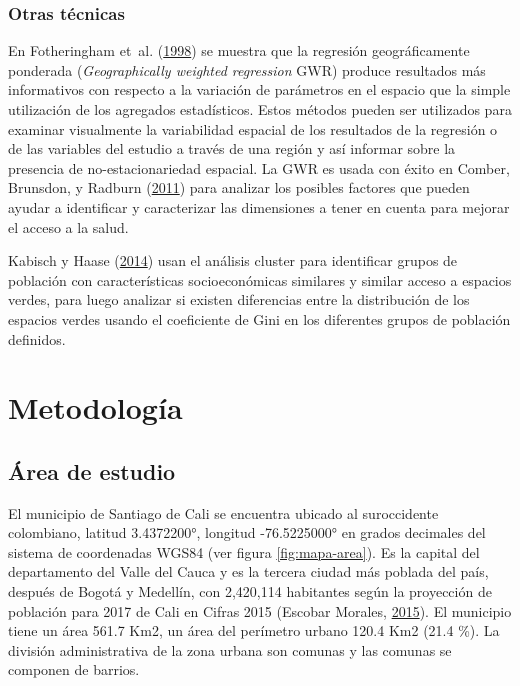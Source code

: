 \documentclass[12pt,a4paper,openany]{book}
\theoremstyle{definition}
\theoremstyle{definition}
\theoremstyle{definition}
\theoremstyle{remark}
\begin{document}
\subsection{Otras técnicas}\label{otras-tuxe9cnicas}

En Fotheringham et~al.
(\protect\hyperlink{ref-fotheringham_geographically_1998}{1998}) se
muestra que la regresión geográficamente ponderada (\emph{Geographically
weighted regression} GWR) produce resultados más informativos con
respecto a la variación de parámetros en el espacio que la simple
utilización de los agregados estadísticos. Estos métodos pueden ser
utilizados para examinar visualmente la variabilidad espacial de los
resultados de la regresión o de las variables del estudio a través de
una región y así informar sobre la presencia de no-estacionariedad
espacial. La GWR es usada con éxito en Comber, Brunsdon, y Radburn
(\protect\hyperlink{ref-comber_spatial_2011}{2011}) para analizar los
posibles factores que pueden ayudar a identificar y caracterizar las
dimensiones a tener en cuenta para mejorar el acceso a la salud.

Kabisch y Haase (\protect\hyperlink{ref-kabisch_green_2014}{2014}) usan
el análisis cluster para identificar grupos de población con
características socioeconómicas similares y similar acceso a espacios
verdes, para luego analizar si existen diferencias entre la distribución
de los espacios verdes usando el coeficiente de Gini en los diferentes
grupos de población definidos.

\chapter{Metodología}\label{meto}

\section{Área de estudio}\label{uxe1rea-de-estudio}

El municipio de Santiago de Cali se encuentra ubicado al suroccidente
colombiano, latitud 3.4372200°, longitud -76.5225000° en grados
decimales del sistema de coordenadas WGS84 (ver figura
\ref{fig:mapa-area}). Es la capital del departamento del Valle del Cauca
y es la tercera ciudad más poblada del país, después de Bogotá y
Medellín, con 2,420,114 habitantes según la proyección de población para
2017 de Cali en Cifras 2015 (Escobar Morales,
\protect\hyperlink{ref-escobar2015cali}{2015}). El municipio tiene un
área 561.7 Km2, un área del perímetro urbano 120.4 Km2 (21.4 \%). La
división administrativa de la zona urbana son comunas y las comunas se
componen de barrios.
\end{document}
